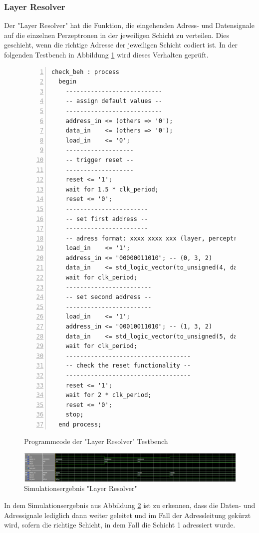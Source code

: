 \documentclass{article}
\numberwithin{equation}{section}
\begin{document}
\subsubsection{Layer Resolver}
Der "Layer Resolver" hat die Funktion, die eingehenden Adress- und Datensignale auf die 
einzelnen Perzeptronen in der jeweiligen Schicht zu verteilen. Dies geschieht, wenn 
die richtige Adresse der jeweiligen Schicht codiert ist. In der folgenden Testbench
in Abbildung \ref{code:layer_resolver_testbench} wird dieses Verhalten geprüft.
\begin{figure}[htbp]
\begin{lstlisting}[style=VHDL,numbers=left,stepnumber=1,style=myCustomMatlabStyle,basicstyle=\footnotesize]
check_beh : process
  begin
    ---------------------------
    -- assign default values --
    ---------------------------
    address_in <= (others => '0');
    data_in    <= (others => '0');
    load_in    <= '0';
    -------------------
    -- trigger reset --
    -------------------
    reset <= '1';
    wait for 1.5 * clk_period;
    reset <= '0';
    -----------------------
    -- set first address --
    -----------------------
    -- adress format: xxxx xxxx xxx (layer, perceptron, value)
    load_in    <= '1';
    address_in <= "00000011010"; -- (0, 3, 2)
    data_in    <= std_logic_vector(to_unsigned(4, data_in'length));
    wait for clk_period;
    ------------------------
    -- set second address --
    ------------------------
    load_in    <= '1';
    address_in <= "00010011010"; -- (1, 3, 2)
    data_in    <= std_logic_vector(to_unsigned(5, data_in'length));
    wait for clk_period;
    -----------------------------------
    -- check the reset functionality --
    -----------------------------------
    reset <= '1';
    wait for 2 * clk_period;
    reset <= '0';
    stop;
  end process;
\end{lstlisting}
\caption{Programmcode der "Layer Resolver" Testbench} \label{code:layer_resolver_testbench}
\end{figure}
\begin{figure}[htb!]
    \begin{center}
      \includegraphics[width=15cm]{SimulationPictures/layer_resolver_sim.png}
    \end{center}
    \caption{Simulationsergebnis "Layer Resolver"} \label{fig:layer_resolver_sim}
  \end{figure}
\FloatBarrier
In dem Simulationsergebnis aus Abbildung \ref{fig:layer_resolver_sim} ist zu erkennen, dass
die Daten- und Adressignale lediglich dann weiter geleitet und im Fall der Adressleitung
gekürzt wird, sofern die richtige Schicht, in dem Fall die Schicht 1 adressiert wurde.
\pagebreak
\end{document}
